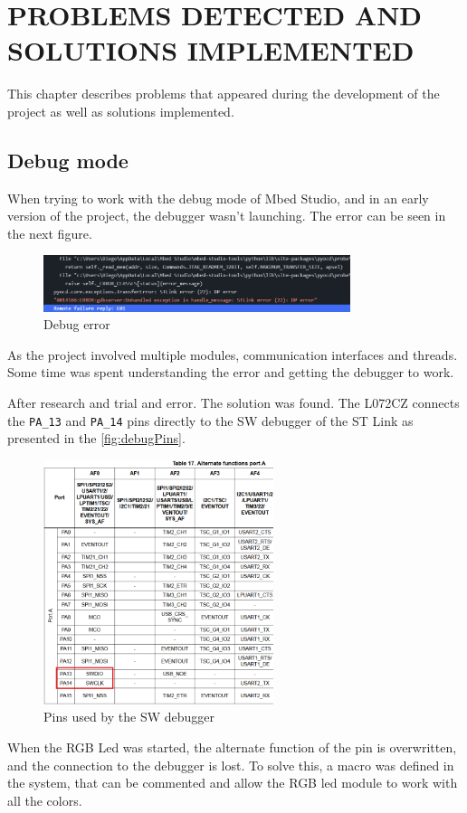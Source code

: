 \section{PROBLEMS DETECTED AND SOLUTIONS IMPLEMENTED}
This chapter describes problems that appeared during the development of the project as well as solutions implemented.
\subsection{Debug mode}
When trying to work with the debug mode of Mbed Studio, and in an early version of the project, the debugger wasn't launching. The error can be seen in the next figure.
\begin{figure}[H]
    \centering
    \includegraphics[width=0.8\textwidth]{images/6/Debug Problem.png}
    \caption{Debug error}
    \label{fig:debugProblem}
\end{figure}
As the project involved multiple modules, communication interfaces and threads. Some time was spent understanding the error and getting the debugger to work.

After research and trial and error. The solution was found. The L072CZ connects the \texttt{PA\_13} and \texttt{PA\_14} pins directly to the SW debugger of the ST Link as presented in the \autoref{fig:debugPins}. 
\begin{figure}[H]
    \centering
    \includegraphics[width=0.6\textwidth]{images/6/DebugPins.png}
    \caption{Pins used by the SW debugger}
    \label{fig:debugPins}
\end{figure}
When the RGB Led was started, the alternate function of the pin is overwritten, and the connection to the debugger is lost. To solve this, a macro was defined in the system, that can be commented and allow the RGB led module to work with all the colors.

